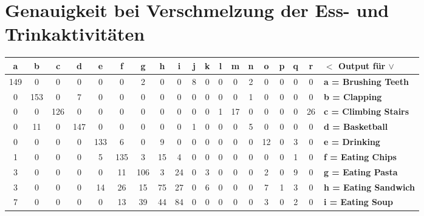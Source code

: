 \section{Genauigkeit bei Verschmelzung der Ess- und Trinkaktivitäten}
\begin{table}
\centering
\begin{tabular}{|c|c|c|c|c|c|c|c|c|c|c|c|c|c|c|c|c|c||l|}
\hline 
\textbf{a} &  \textbf{b} & \textbf{c} & \textbf{d} & \textbf{e} & \textbf{f} & \textbf{g} & \textbf{h} & \textbf{i} & \textbf{j} & \textbf{k} & \textbf{l} & \textbf{m} & \textbf{n} & \textbf{o} & \textbf{p} & \textbf{q} & \textbf{r} & \textbf{$<$ Output für $\vee$} \\
\hline 
\hline 
149 & 0 & 0 & 0 & 0 & 0 & 2 & 0 & 0 & 8 & 0 & 0 & 0 & 2 & 0 & 0 & 0 & 0 & \textbf{a = Brushing Teeth} \\
\hline 
0 & 153 & 0 & 7 & 0 & 0 & 0 & 0 & 0 & 0 & 0 & 0 & 0 & 1 & 0 & 0 & 0 & 0 & \textbf{b = Clapping} \\
\hline 
0 & 0 & 126 & 0 & 0 & 0 & 0 & 0 & 0 & 0 & 0 & 1 &17 & 0 & 0 & 0 & 0 & 26 & \textbf{c = Climbing Stairs} \\
\hline 
0 & 11 & 0 & 147 & 0 & 0 & 0 & 0 & 0 & 1 & 0 & 0 & 0 & 5 & 0 & 0 & 0 & 0 & \textbf{d = Basketball} \\
\hline 
0 & 0 & 0 & 0 & \cellcolor{lightgray} 133 & \cellcolor{lightgray} 6 & \cellcolor{lightgray} 0 & \cellcolor{lightgray} 9 & \cellcolor{lightgray}  0 & 0 & 0 & 0 & 0 & 0 & 12 & 0 & 3 & 0 & \textbf{e = Drinking} \\
\hline 
1 & 0 & 0 & 0 & \cellcolor{lightgray} 5 & \cellcolor{lightgray} 135 & \cellcolor{lightgray} 3 & \cellcolor{lightgray} 15 & \cellcolor{lightgray} 4 & 0 & 0 & 0 & 0 & 0 & 0 & 0 & 1 & 0 & \textbf{f = Eating Chips} \\
\hline 
3 & 0 & 0 & 0 & \cellcolor{lightgray} 0 & \cellcolor{lightgray} \cellcolor{lightgray} 11 & \cellcolor{lightgray} 106 & \cellcolor{lightgray} 3 & \cellcolor{lightgray} 24 & 0 & 3 & 0 & 0 & 0 & 2 & 0 & 9 & 0 & \textbf{g = Eating Pasta} \\
\hline 
3 & 0 & 0 & 0 & \cellcolor{lightgray} 14 & \cellcolor{lightgray} 26 & \cellcolor{lightgray} 15 & \cellcolor{lightgray} 75 & \cellcolor{lightgray} 27 & 0 & 6 & 0 & 0 & 0 & 7 & 1 & 3 & 0 & \textbf{h = Eating Sandwich} \\
\hline 
7 & 0 & 0 & 0 & \cellcolor{lightgray} 0 & \cellcolor{lightgray} 13 & \cellcolor{lightgray} 39 & \cellcolor{lightgray} 44 & \cellcolor{lightgray} 84 & 0 & 0 & 0 & 0 & 0 & 3 & 0 & 2 & 0 & \textbf{i = Eating Soup} \\

\end{tabular}
\end{table}
